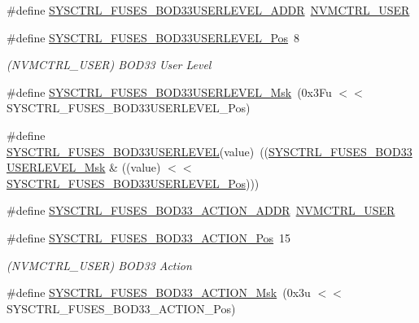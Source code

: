 \begin{DoxyCompactItemize}
\item 
\#define \mbox{\hyperlink{group__fuses__api_gac0d9c42a97e796a5e5e804816b4d7b1d}{S\+Y\+S\+C\+T\+R\+L\+\_\+\+F\+U\+S\+E\+S\+\_\+\+B\+O\+D33\+U\+S\+E\+R\+L\+E\+V\+E\+L\+\_\+\+A\+D\+DR}}~\mbox{\hyperlink{group___s_a_m_d21_j18_a__base_ga7a7a83a5753fa323b61536e396083c99}{N\+V\+M\+C\+T\+R\+L\+\_\+\+U\+S\+ER}}
\item 
\#define \mbox{\hyperlink{group__fuses__api_ga6381d49a42185e3592002205884ddb7a}{S\+Y\+S\+C\+T\+R\+L\+\_\+\+F\+U\+S\+E\+S\+\_\+\+B\+O\+D33\+U\+S\+E\+R\+L\+E\+V\+E\+L\+\_\+\+Pos}}~8
\begin{DoxyCompactList}\small\item\em (N\+V\+M\+C\+T\+R\+L\+\_\+\+U\+S\+ER) B\+O\+D33 User Level \end{DoxyCompactList}\item 
\#define \mbox{\hyperlink{group__fuses__api_gad3ecc5169d945ad7334890717f3194fb}{S\+Y\+S\+C\+T\+R\+L\+\_\+\+F\+U\+S\+E\+S\+\_\+\+B\+O\+D33\+U\+S\+E\+R\+L\+E\+V\+E\+L\+\_\+\+Msk}}~(0x3\+Fu $<$$<$ S\+Y\+S\+C\+T\+R\+L\+\_\+\+F\+U\+S\+E\+S\+\_\+\+B\+O\+D33\+U\+S\+E\+R\+L\+E\+V\+E\+L\+\_\+\+Pos)
\item 
\#define \mbox{\hyperlink{group__fuses__api_gab96b2e14250f896173693537bf83cbed}{S\+Y\+S\+C\+T\+R\+L\+\_\+\+F\+U\+S\+E\+S\+\_\+\+B\+O\+D33\+U\+S\+E\+R\+L\+E\+V\+EL}}(value)~((\mbox{\hyperlink{group__fuses__api_gad3ecc5169d945ad7334890717f3194fb}{S\+Y\+S\+C\+T\+R\+L\+\_\+\+F\+U\+S\+E\+S\+\_\+\+B\+O\+D33\+U\+S\+E\+R\+L\+E\+V\+E\+L\+\_\+\+Msk}} \& ((value) $<$$<$ \mbox{\hyperlink{group__fuses__api_ga6381d49a42185e3592002205884ddb7a}{S\+Y\+S\+C\+T\+R\+L\+\_\+\+F\+U\+S\+E\+S\+\_\+\+B\+O\+D33\+U\+S\+E\+R\+L\+E\+V\+E\+L\+\_\+\+Pos}})))
\item 
\#define \mbox{\hyperlink{group__fuses__api_gaf343fe7bba1aa7b1f37385bab8c3a022}{S\+Y\+S\+C\+T\+R\+L\+\_\+\+F\+U\+S\+E\+S\+\_\+\+B\+O\+D33\+\_\+\+A\+C\+T\+I\+O\+N\+\_\+\+A\+D\+DR}}~\mbox{\hyperlink{group___s_a_m_d21_j18_a__base_ga7a7a83a5753fa323b61536e396083c99}{N\+V\+M\+C\+T\+R\+L\+\_\+\+U\+S\+ER}}
\item 
\#define \mbox{\hyperlink{group__fuses__api_ga84147f85a3d72236d61fef80eca32bb1}{S\+Y\+S\+C\+T\+R\+L\+\_\+\+F\+U\+S\+E\+S\+\_\+\+B\+O\+D33\+\_\+\+A\+C\+T\+I\+O\+N\+\_\+\+Pos}}~15
\begin{DoxyCompactList}\small\item\em (N\+V\+M\+C\+T\+R\+L\+\_\+\+U\+S\+ER) B\+O\+D33 Action \end{DoxyCompactList}\item 
\#define \mbox{\hyperlink{group__fuses__api_gaaa6355ac55da3df5a629bb56fd780806}{S\+Y\+S\+C\+T\+R\+L\+\_\+\+F\+U\+S\+E\+S\+\_\+\+B\+O\+D33\+\_\+\+A\+C\+T\+I\+O\+N\+\_\+\+Msk}}~(0x3u $<$$<$ S\+Y\+S\+C\+T\+R\+L\+\_\+\+F\+U\+S\+E\+S\+\_\+\+B\+O\+D33\+\_\+\+A\+C\+T\+I\+O\+N\+\_\+\+Pos)
$$
\end{DoxyCompactItemize}
